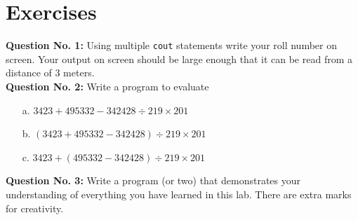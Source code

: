 \documentclass[12pt,a4paper]{article}
\begin{document}
\section{Exercises}
\noindent\textbf{Question No. 1:} Using multiple \verb|cout| statements write your roll number on screen. Your output on screen should be large enough that it can be read from a distance of 3 meters.\\[0.2cm]
\noindent\textbf{Question No. 2:} Write a program to evaluate
\begin{enumerate}
\item[a.] $3423+495332-342428\div219\times201$
\item[b.] $(3423+495332-342428)\div219\times201$
\item[c.] $3423+(495332-342428)\div219\times201$
\end{enumerate}
\noindent\textbf{Question No. 3:} Write a program (or two) that demonstrates your understanding of everything you have learned in this lab. There are extra marks for creativity.
\end{document}
